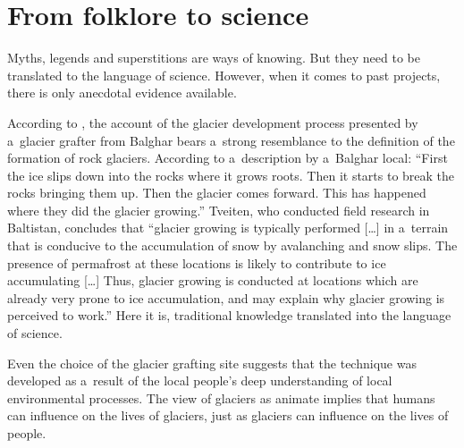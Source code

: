 \section{From folklore to science}

Myths, legends and superstitions are ways of knowing. But they need to be translated to the language of science.
However, when it comes to past projects, there is only anecdotal evidence available.

According to \citet{tveitenGlacierGrowingLocal2007}, the account of the glacier development process presented
by a glacier grafter from Balghar bears a strong resemblance to the definition of the formation of rock
glaciers. According to a description by a Balghar local: “First the ice slips down into the rocks where it grows
roots. Then it starts to break the rocks bringing them up. Then the glacier comes forward. This has happened
where they did the glacier growing.” Tveiten, who conducted field research in Baltistan, concludes that “glacier
growing is typically performed […] in a terrain that is conducive to the accumulation of snow by avalanching and
snow slips. The presence of permafrost at these locations is likely to contribute to ice accumulating […] Thus,
glacier growing is conducted at locations which are already very prone to ice accumulation, and may explain why
glacier growing is perceived to work.” Here it is, traditional knowledge translated into the language of
science.

Even the choice of the glacier grafting site suggests that the technique was developed as a result of the local
people’s deep understanding of local environmental processes. The view of glaciers as animate implies that
humans can influence on the lives of glaciers, just as glaciers can influence on the lives of people.

